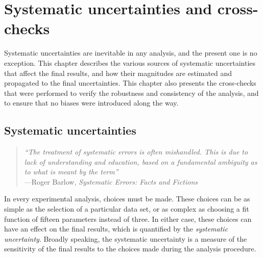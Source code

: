 \chapter{Systematic uncertainties and cross-checks}
\label{chapter_systematics}
Systematic uncertainties are inevitable in any analysis, and the present one is no exception. This chapter describes the various sources of systematic uncertainties that affect the final results, and how their magnitudes are estimated and propagated to the final uncertainties. This chapter also presents the cross-checks that were performed to verify the robustness and consistency of the analysis, and to ensure that no biases were introduced along the way.

\section{Systematic uncertainties}
\label{sec:systematics}
\begin{quote}
    \textit{``The treatment of systematic errors is often mishandled. This is due to lack of understanding and education, based on a fundamental ambiguity as to what is meant by the term''}\\
    \hspace*{1cm}---Roger Barlow, \textit{Systematic Errors: Facts and Fictions}~\cite{BarlowCheck}
\end{quote}

In every experimental analysis, choices must be made. These choices can be as simple as the selection of a particular data set, or as complex as choosing a fit function of fifteen parameters instead of three. In either case, these choices can have an effect on the final results, which is quantified by the \textit{systematic uncertainty}. Broadly speaking, the systematic uncertainty is a measure of the sensitivity of the final results to the choices made during the analysis procedure. 

